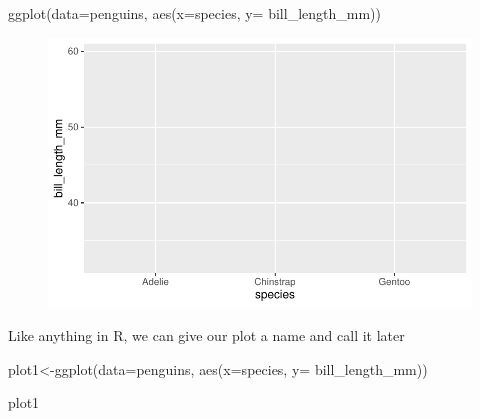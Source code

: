 \documentclass[
  letterpaper,
  DIV=11,
  numbers=noendperiod]{scrartcl}
\newenvironment{Shaded}{\begin{snugshade}}{\end{snugshade}}
\newcommand{\AttributeTok}[1]{\textcolor[rgb]{0.40,0.45,0.13}{#1}}
\newcommand{\FunctionTok}[1]{\textcolor[rgb]{0.28,0.35,0.67}{#1}}
\newcommand{\NormalTok}[1]{\textcolor[rgb]{0.00,0.23,0.31}{#1}}
\newcommand{\OtherTok}[1]{\textcolor[rgb]{0.00,0.23,0.31}{#1}}
\begin{document}
\begin{Shaded}
\begin{Highlighting}[]
\FunctionTok{ggplot}\NormalTok{(}\AttributeTok{data=}\NormalTok{penguins, }\FunctionTok{aes}\NormalTok{(}\AttributeTok{x=}\NormalTok{species, }\AttributeTok{y=}\NormalTok{ bill\_length\_mm)) }
\end{Highlighting}
\end{Shaded}

\begin{figure}[H]

{\centering \includegraphics{Lab_2_files/figure-pdf/unnamed-chunk-3-1.pdf}

}

\end{figure}

Like anything in R, we can give our plot a name and call it later

\begin{Shaded}
\begin{Highlighting}[]
\NormalTok{plot1}\OtherTok{\textless{}{-}}\FunctionTok{ggplot}\NormalTok{(}\AttributeTok{data=}\NormalTok{penguins, }\FunctionTok{aes}\NormalTok{(}\AttributeTok{x=}\NormalTok{species, }\AttributeTok{y=}\NormalTok{ bill\_length\_mm)) }

\NormalTok{plot1}
\end{Highlighting}
\end{Shaded}
\end{document}
